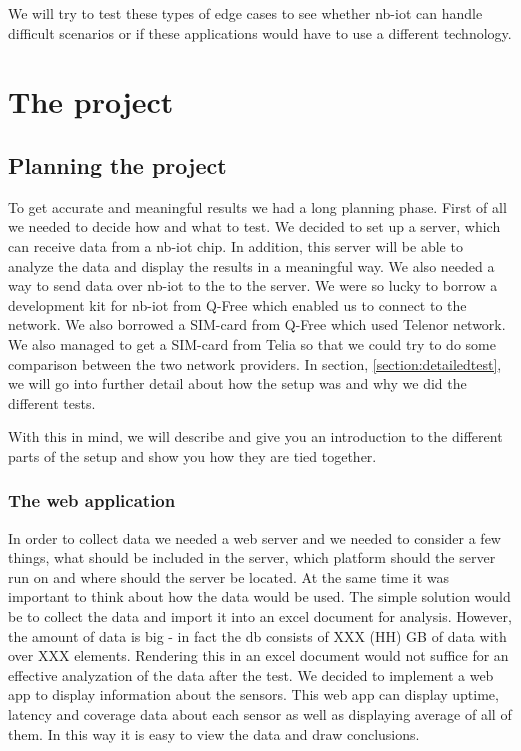 \documentclass[USenglish]{ifimaster}  %
\begin{document}
We will try to test these types of edge cases to see whether \acrshort{nb-iot} can handle difficult scenarios or if these applications would have to use a different technology.

\part{The project}
\chapter{Planning the project}
To get accurate and meaningful results we had a long planning phase. First of all we needed to decide how and what to test. We decided to set up a server, which can receive data from a \acrshort{nb-iot} chip. In addition, this server will be able to analyze the data and display the results in a meaningful way. We also needed a way to send data over \acrshort{nb-iot} to the to the server. We were so lucky to borrow a development kit for \acrshort{nb-iot} from Q-Free which enabled us to connect to the network. We also borrowed a SIM-card from Q-Free which used Telenor network. We also managed to get a SIM-card from Telia so that we could try to do some comparison between the two network providers. In section, \vref{section:detailedtest}, we will go into further detail about how the setup was and why we did the different tests.

With this in mind, we will describe and give you an introduction to the different parts of the setup and show you how they are tied together.


\section{The web application}
In order to collect data we needed a web server and we needed to consider a few things, what should be included in the server, which platform should the server run on and where should the server be located. At the same time it was important to think about how the data would be used. The simple solution would be to collect the data and import it into an excel document for analysis. However, the amount of data is big - in fact the db consists of XXX (HH) GB of data with over XXX elements. Rendering this in an excel document would not suffice for an effective analyzation of the data after the test. We decided to implement a web app to display information about the sensors. This web app can display uptime, latency and coverage data about each sensor as well as displaying average of all of them. In this way it is easy to view the data and draw conclusions.
\end{document}
